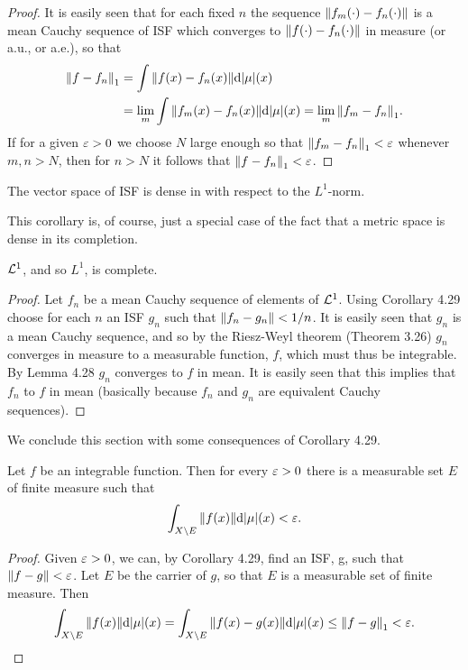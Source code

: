 \begin{proof}
It is easily seen that for each fixed $n$ the sequence $\norm{f_m(\cdot)-f_n(\cdot)}$ is a mean Cauchy sequence of ISF which converges to $\norm{f(\cdot)-f_n(\cdot)}$ in measure (or a.u., or a.e.), so that
\begin{align*}
    \norm{f-f_n}_1&=\int\norm{f(x)-f_n(x)}\dd|\mu|(x)\\
    &=\lim_m\int\norm{f_m(x)-f_n(x)}\dd|\mu|(x)=\lim_m\norm{f_m-f_n}_1.
\end{align*}
If for a given $\varepsilon>0$ we choose $N$ large enough so that $\norm{f_m-f_n}_1<\varepsilon$ whenever $m,n>N$, then for $n>N$ it follows that $\norm{f-f_n}_1<\varepsilon$.
\end{proof}

\begin{corollary}
The vector space of ISF is dense in with respect to the $L^1$-norm.
\end{corollary}

This corollary is, of course, just a special case of the fact that a metric space is dense in its completion.

\begin{theorem}
${\cal L}^1$, and so $L^1$, is complete.
\end{theorem}

\begin{proof}
Let $f_n$ be a mean Cauchy sequence of elements of ${\cal L}^1$. Using Corollary 4.29 choose for each $n$ an ISF $g_n$ such that $\norm{f_n-g_n}<1/n$. It is easily seen that $g_n$ is a mean Cauchy sequence, and so by the Riesz-Weyl theorem (Theorem 3.26) $g_n$ converges in measure to a measurable function, $f$, which must thus be integrable. By Lemma 4.28 $g_n$ converges to $f$ in mean. It is easily seen that this implies that $f_n$ to $f$ in mean (basically because $f_n$ and $g_n$ are equivalent Cauchy sequences).
\end{proof}

We conclude this section with some consequences of Corollary 4.29.

\begin{proposition}
Let $f$ be an integrable function. Then for every $\varepsilon>0$ there is a measurable set $E$ of finite measure such that $$\int_{X\setminus E}\norm{f(x)}\dd|\mu|(x)<\varepsilon.$$
\end{proposition}

\begin{proof}
Given $\varepsilon>0$, we can, by Corollary 4.29, find an ISF, g, such that $\norm{f-g}<\varepsilon$. Let $E$ be the carrier of $g$, so that $E$ is a measurable set of finite measure. Then $$\int_{X\setminus E}\norm{f(x)}\dd|\mu|(x)=\int_{X\setminus E}\norm{f(x)-g(x)}\dd|\mu|(x)\leq\norm{f-g}_1<\varepsilon.$$
\end{proof}

